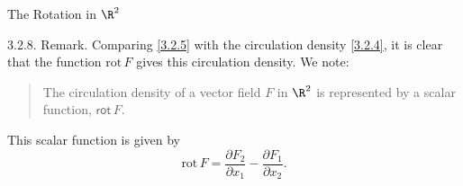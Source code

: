 \documentclass[smaller,hyperref={CJKbookmarks=true}]{beamer}
\begin{document}
\begin{frame}{The Rotation in $\R^2$}
\newpage
\begin{spacing}{1.2}
\vspace*{13pt}
\alert{3.2.8. Remark.} Comparing \eqref{3.2.5} with the circulation density \eqref{3.2.4}, it is clear that the function $\text{rot}\,F$ gives this circulation density. We note:
\begin{quote}
  The circulation density of a vector field $F$ in $\R^2$ is represented by a scalar function, $\mathsf{rot}\,F$.
\end{quote}
This scalar function is given by
\begin{equation}\label{3.2.6}
\text{rot}\,F=\frac{\partial F_2}{\partial x_1}-\frac{\partial F_1}{\partial x_2}.
\end{equation}
\end{spacing}
\end{frame}
\end{document}

